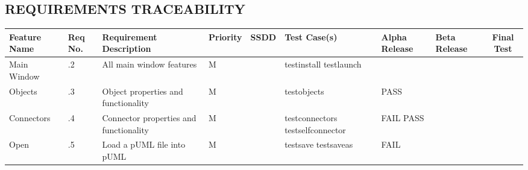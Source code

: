 \documentclass[twoside,letterpaper]{article}
\begin{document}


\clearpage\setcounter{page}{1}\pagestyle{Convertvi}

\begin{landscape}

\section[REQUIREMENTS TRACEABILITY]
  {\bfseries REQUIREMENTS TRACEABILITY}
{\itshape }

\bigskip

\begin{flushleft}
\tablehead{}
\begin{supertabular}[c]{|
                        m{0.9in}|m{0.4in}|m{2.0in}|
                        m{0.4in}|m{0.5in}|m{1.0in}|
                        m{1.0in}|m{1.0in}|c|
                       }
\hline
 
  \centering \bfseries Feature Name &
  \centering \bfseries Req No. &
  \centering \bfseries Requirement Description &
  \centering \bfseries Priority &
  \centering \bfseries SSDD &
  \centering \bfseries Test Case(s) & 
  \centering \bfseries Alpha Release &
  \centering \bfseries Beta Release &
  \bfseries Final Test
\\\hline
  
  Main Window
  & .2 
  & All main window features 
  & \centering M 
  & ~
  & testinstall \newline 
    testlaunch 
  & ~ 
  & ~ 
  & ~ 
\\\hline

  Objects
  & .3
  & Object properties and functionality
  & \centering M 
  & ~ 
  & testobjects
  & PASS
  & ~ 
  & ~ 
\\\hline

  Connectors
  & .4 
  & Connector properties and functionality
  & \centering M 
  & ~ 
  & testconnectors\newline 
    testselfconnector
  & FAIL \newline
    PASS
  & ~ \newline
    ~
  & ~ \newline
    ~
\\\hline

  Open
  & .5
  & Load a pUML file into pUML 
  & \centering M 
  & ~ 
  & testsave \newline
    testsaveas 
  & FAIL
  & ~ \newline
    ~
  & ~ \newline
    ~
\\\hline


\end{supertabular}
\end{flushleft}
\end{landscape}
\end{document}
